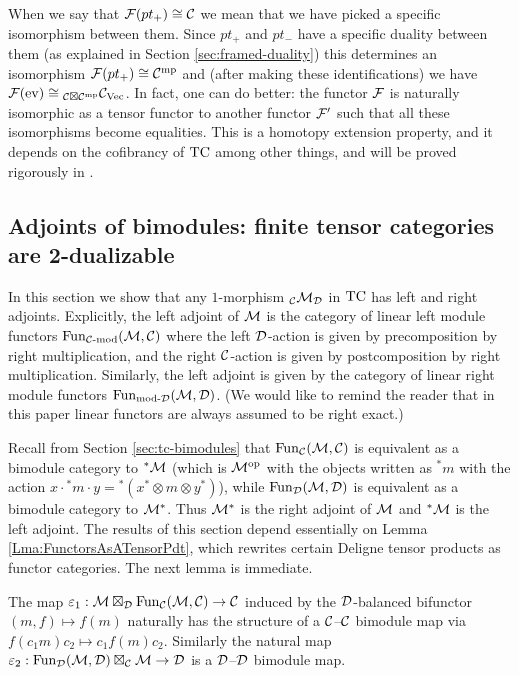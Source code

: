 \documentclass{amsart}
\begin{document}
\begin{remark}
When we say that $\mathcal F(pt_+) \cong \mathcal C$ we mean that we have picked a specific isomorphism between them.  Since $pt_+$ and $pt_-$ have a specific duality between them (as explained in Section \ref{sec:framed-duality}) this determines an isomorphism $\mathcal F(pt_+) \cong \mathcal C^{\mathrm{mp}}$ and (after making these identifications) we have $\mathcal F(\mathrm{ev}) \cong {}_{\mathcal C \boxtimes \mathcal C^{\mathrm{mp}}} {\mathcal C}_{\mathrm{Vec}}$.  In fact, one can do better: the functor $\mathcal F$ is naturally isomorphic as a tensor functor to another functor $\mathcal F'$ such that all these isomorphisms become equalities.  This is a homotopy extension property, and it depends on the cofibrancy of $\mathrm{TC}$ among other things, and will be proved rigorously in \cite{3TC}.
\end{remark}


\subsection{Adjoints of bimodules: finite tensor categories are 2-dualizable}  \label{sec:df-modules}

In this section we show that any $1$-morphism ${}_\mathcal C \mathcal M_\mathcal D$ in $\mathrm{TC}$ has left and right adjoints.   Explicitly, the left adjoint of $\mathcal M$ is the category of linear left module functors $\operatorname{Fun}_{{\mathcal C\text{-mod}}}(\mathcal M, \mathcal C)$ where the left $\mathcal D$-action is given by precomposition by right multiplication, and the right $\mathcal C$-action is given by postcomposition by right multiplication.  Similarly, the left adjoint is given by the category of linear right module functors $\operatorname{Fun}_{\text{mod-}\mathcal D}(\mathcal M, \mathcal D)$.   (We would like to remind the reader that in this paper linear functors are always assumed to be right exact.)  

Recall from Section \ref{sec:tc-bimodules} that 
$\operatorname{Fun}_{{\mathcal C}}(\mathcal M, \mathcal C)$ is equivalent as a bimodule category to ${}^*\mathcal M$ (which is $\mathcal M^{\mathrm{op}}$ with the objects written as ${}^*m$ with the action $x \cdot {}^*m \cdot y = {}^*(x^* \otimes m \otimes y^*)$), while $\operatorname{Fun}_{\mathcal D}(\mathcal M, \mathcal D)$ is equivalent as a bimodule category to $\mathcal M^*$.  Thus $\mathcal M^*$ is the right adjoint of $\mathcal M$ and ${}^* \mathcal M$ is the left adjoint.
The results of this section depend essentially on Lemma \ref{Lma:FunctorsAsATensorPdt}, which rewrites certain Deligne tensor products as functor categories. The next lemma is immediate. 

\begin{lemma}
The map $\varepsilon_1: \mathcal M \boxtimes_{\mathcal D} \operatorname{Fun}_{\mathcal C}(\mathcal M, \mathcal C) \rightarrow \mathcal C$ induced by the $\mathcal D$-balanced bifunctor $(m, f) \mapsto f(m)$ naturally has the structure of a $\mathcal C$--$\mathcal C$ bimodule map via $ f(c_1 m) c_2 \mapsto c_1 f(m) c_2$. Similarly the natural map $\varepsilon_2: \operatorname{Fun}_{{\mathcal D}}(\mathcal M, \mathcal D) \boxtimes_{\mathcal C} \mathcal M \rightarrow \mathcal D$ is a $\mathcal D$--$\mathcal D$ bimodule map. 
\end{lemma} 
\end{document}
